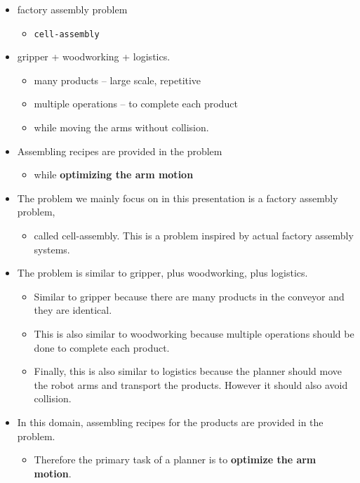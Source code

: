 \begin{itemize}
\item factory assembly problem
\begin{itemize}
\item \texttt{cell-assembly}
\end{itemize}
\item gripper + woodworking + logistics.
\begin{itemize}
\item many products -- large scale, repetitive
\item multiple operations -- to complete each product
\item while moving the arms without collision.
\end{itemize}
\item Assembling recipes are provided in the problem
\begin{itemize}
\item while \textbf{optimizing the arm motion}
\end{itemize}
\end{itemize}
\begin{resume}
\begin{itemize}
\item The problem we mainly focus on in this presentation is a factory assembly problem,
\begin{itemize}
\item called cell-assembly. This is a problem inspired by actual factory assembly systems.
\end{itemize}
\item The problem is similar to gripper, plus woodworking, plus logistics.
\begin{itemize}
\item Similar to gripper because there are many products in the conveyor and they are identical.
\item This is also similar to woodworking because multiple operations should be done to complete each product.
\item Finally, this is also similar to logistics because 
the planner should move the robot arms and transport the products.
However it should also avoid collision.
\end{itemize}
\item In this domain, assembling recipes for the products are provided in the problem.
\begin{itemize}
\item Therefore the primary task of a planner is to \textbf{optimize the arm motion}.
\end{itemize}
\end{itemize}
\end{resume}


